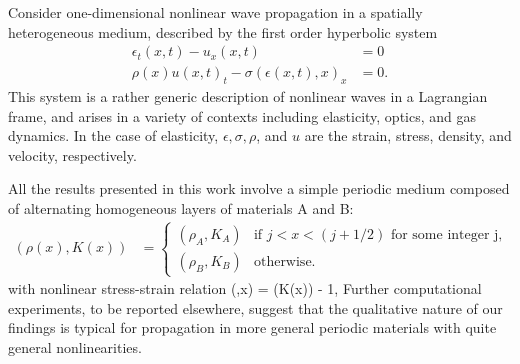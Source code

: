 Consider one-dimensional nonlinear wave propagation in a spatially
heterogeneous medium, described by the first order hyperbolic system
\begin{subequations} \label{nel_pde}
\begin{align}
\epsilon_t(x,t)-u_x(x,t) & = 0 \\
\rho(x)u(x,t)_t - \sigma(\epsilon(x,t),x)_x & = 0.
\end{align}
\end{subequations}
This system is a rather generic description of nonlinear waves in a 
Lagrangian frame, and arises in a variety
of contexts including elasticity, optics, and gas dynamics.
In the case of elasticity, $\epsilon,\sigma,\rho$, and $u$ are the
strain, stress, density, and velocity, respectively.

All the results presented in this work involve a simple periodic medium
composed of alternating homogeneous layers of materials A and B:
\begin{align} \label{LYmedium}
(\rho(x),K(x)) & = \left\{ \begin{array}{ll}
 (\rho_A,K_A) & \text{if } j< x < (j+1/2)
   \mbox{ for some integer j}, \\
 (\rho_B,K_B) & \mbox{otherwise.} \end{array}\right.
\end{align}
with nonlinear stress-strain relation
\be \label{expstress}
\sigma(\epsilon,x) = \exp(K(x)\epsilon) - 1,
\ee
Further computational experiments, to be reported elsewhere, suggest that 
the qualitative nature of our findings is typical for propagation in
more general periodic materials with quite general nonlinearities.



